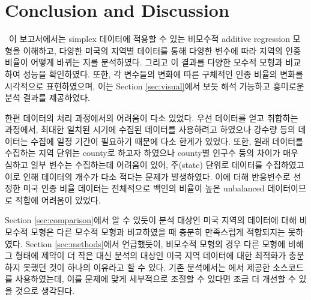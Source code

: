 \section{Conclusion and Discussion}\label{sec:conclusion}

\ \quad 이 보고서에서는 simplex 데이터에 적용할 수 있는 비모수적 additive regression 모형을 이해하고, 다양한 미국의 지역별 데이터를 통해 다양한 변수에 따라 지역의 인종 비율이 어떻게 바뀌는 지를 분석하였다. 그리고 이 결과를 다양한 모수적 모형과 비교하여 성능을 확인하였다. 또한, 각 변수들의 변화에 따른 구체적인 인종 비율의 변화를 시각적으로 표현하였으며, 이는 Section \ref{sec:visual}에서 보듯 해석 가능하고 흥미로운 분석 결과를 제공하였다.

한편 데이터의 처리 과정에서의 어려움이 다소 있었다. 우선 데이터를 얻고 취합하는 과정에서, 최대한 일치된 시기에 수집된 데이터를 사용하려고 하였으나 강수량 등의 데이터는 수집에 일정 기간이 필요하기 때문에 다소 한계가 있었다. 또한, 원래 데이터를 수집하는 지역 단위는 county로 하고자 하였으나 county별 인구수 등의 차이가 매우 심하고 일부 변수는 수집하는데 어려움이 있어, 주(state) 단위로 데이터를 수집하였고 이로 인해 데이터의 개수가 다소 적다는 문제가 발생하였다. 이에 더해 반응변수로 선정한 미국 인종 비율 데이터는 전체적으로 백인의 비율이 높은 unbalanced 데이터이므로 적합에 어려움이 있었다.

Section \ref{sec:comparison}에서 알 수 있듯이 분석 대상인 미국 지역의 데이터에 대해 비모수적 모형은 다른 모수적 모형과 비교하였을 때 충분히 만족스럽게 적합되지는 못하였다. Section \ref{sec:methods}에서 언급했듯이, 비모수적 모형의 경우 다른 모형에 비해 그 형태에 제약이 더 작은 대신 분석의 대상인 미국 지역 데이터에 대한 최적화가 충분하지 못했던 것이 하나의 이유라고 할 수 있다. 기존 분석에서는 \citet{jeon2018additive}에서 제공한 소스코드를 사용하였는데, 이를 문제에 맞게 세부적으로 조절할 수 있다면 조금 더 개선할 수 있을 것으로 생각된다. 
